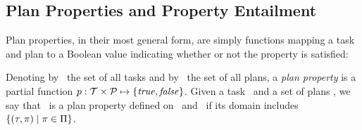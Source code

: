 




\subsection{Plan Properties and Property Entailment}

Plan properties, in their most general form, are simply functions
mapping a task and plan to a Boolean value indicating whether or not
the property is satisfied:

\begin{definition}
Denoting by \alltasks\ the set of all tasks and by \allplans\ the set
of all plans, a \emph{plan property} is a partial function $p :
\cal T \times \cal P \mapsto \{\mathit{true}, \mathit{false}\}$. Given a task
\task\ and a set of plans \plans, we say that \prop\ is a plan
property defined on \task\ and \plans\ if its domain includes
$\{(\tau,\pi) \mid \pi \in \Pi\}$.
\end{definition}

